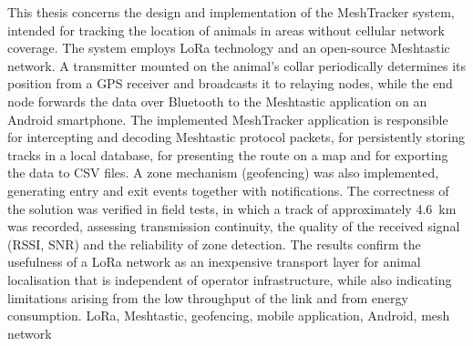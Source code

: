 \documentclass[
    left=2.5cm,         %
    right=2.5cm,        %
    top=2.5cm,          %
    bottom=3cm,         %
    bindingoffset=6mm,  %
    nohyphenation=false %
]{eiti/eiti-thesis}
\begin{document}
\newpage
\abstract
This thesis concerns the design and implementation of the MeshTracker system, intended for tracking the
location of animals in areas without cellular network coverage. The system employs LoRa technology and an
open-source Meshtastic network. A transmitter mounted on the animal's collar periodically
determines its position from a GPS receiver and broadcasts it to relaying nodes, while the end node forwards
the data over Bluetooth to the Meshtastic application on an Android smartphone. The implemented MeshTracker
application is responsible for intercepting and decoding Meshtastic protocol packets, for persistently storing
tracks in a local database, for presenting the route on a map and for exporting the data to CSV files. A zone
mechanism (geofencing) was also implemented, generating entry and exit events together with notifications.
The correctness of the solution was verified in field tests, in which a track of approximately 4.6~km was
recorded, assessing transmission continuity, the quality of the received signal (RSSI, SNR) and the reliability
of zone detection. The results confirm the usefulness of a LoRa network as an inexpensive transport layer for
animal localisation that is independent of operator infrastructure, while also indicating limitations arising
from the low throughput of the link and from energy consumption.
\keywords LoRa, Meshtastic, geofencing, mobile application, Android, mesh network

\cleardoublepage  %
\pagestyle{plain}
\makeauthorship

\cleardoublepage %
\tableofcontents

\cleardoublepage %
\pagestyle{headings}











\cleardoublepage %
\printbibliography

\newpage
\pagestyle{plain}

\listoffigurestoc     %
\vspace{1cm}
\listoftablestoc      %
\end{document}
